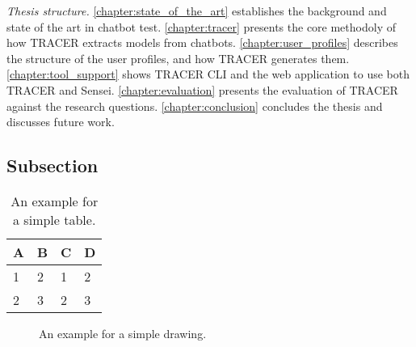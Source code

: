 \textit{Thesis structure.}
\autoref{chapter:state_of_the_art} establishes the background and state of the art in chatbot test.
\autoref{chapter:tracer} presents the core methodoly of how \ac{TRACER} extracts models from chatbots.
\autoref{chapter:user_profiles} describes the structure of the user profiles, and how \ac{TRACER} generates them.
\autoref{chapter:tool_support} shows \ac{TRACER} \ac{CLI} and the web application to use both \ac{TRACER} and Sensei.
\autoref{chapter:evaluation} presents the evaluation of \ac{TRACER} against the research questions.
\autoref{chapter:conclusion} concludes the thesis and discusses future work.




\subsection{Subsection}


\begin{table}[htpb]
  \caption[Example table]{An example for a simple table.}\label{tab:sample}
  \centering
  \begin{tabular}{l l l l}
    \toprule
      A & B & C & D \\
    \midrule
      1 & 2 & 1 & 2 \\
      2 & 3 & 2 & 3 \\
    \bottomrule
  \end{tabular}
\end{table}

\begin{figure}[htpb]
  \centering
  \caption[Example drawing]{An example for a simple drawing.}\label{fig:sample-drawing}
\end{figure}

